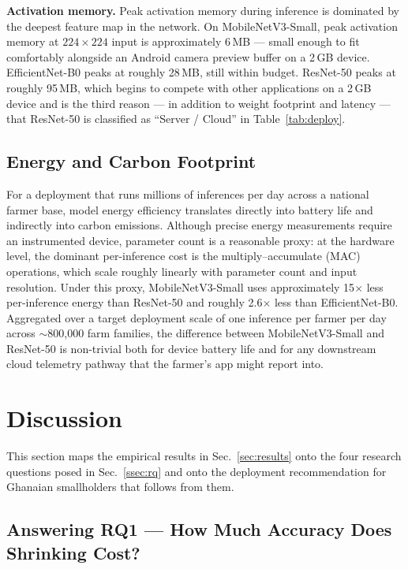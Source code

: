 \documentclass[conference,10pt]{IEEEtran}
\begin{document}
\textbf{Activation memory.} Peak activation memory during inference is
dominated by the deepest feature map in the network. On MobileNetV3-Small,
peak activation memory at $224\times224$ input is approximately 6\,MB —
small enough to fit comfortably alongside an Android camera preview buffer
on a 2\,GB device. EfficientNet-B0 peaks at roughly 28\,MB, still within
budget. ResNet-50 peaks at roughly 95\,MB, which begins to compete with
other applications on a 2\,GB device and is the third reason — in addition
to weight footprint and latency — that ResNet-50 is classified as
``Server / Cloud'' in Table~\ref{tab:deploy}.

\subsection{Energy and Carbon Footprint}

For a deployment that runs millions of inferences per day across a national
farmer base, model energy efficiency translates directly into battery life
and indirectly into carbon emissions. Although precise energy measurements
require an instrumented device, parameter count is a reasonable proxy: at
the hardware level, the dominant per-inference cost is the multiply--accumulate
(MAC) operations, which scale roughly linearly with parameter count and
input resolution. Under this proxy, MobileNetV3-Small uses approximately
15$\times$ less per-inference energy than ResNet-50 and roughly 2.6$\times$
less than EfficientNet-B0. Aggregated over a target deployment scale of one
inference per farmer per day across $\sim$800{,}000 farm families, the
difference between MobileNetV3-Small and ResNet-50 is non-trivial both for
device battery life and for any downstream cloud telemetry pathway that the
farmer's app might report into.

\section{Discussion}\label{sec:discussion}

This section maps the empirical results in Sec.~\ref{sec:results} onto the
four research questions posed in Sec.~\ref{ssec:rq} and onto the deployment
recommendation for Ghanaian smallholders that follows from them.

\subsection{Answering RQ1 — How Much Accuracy Does Shrinking Cost?}
\end{document}
